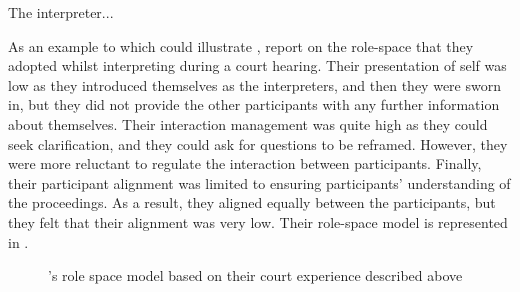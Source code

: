 \documentclass[output=paper]{langsci/langscibook}
\begin{document}
\begin{table}
The interpreter...
\caption{\label{tab:devaux:1}Sample list of role-space criteria}
\end{table}
As an example to which could illustrate , \citet[77--78]{Llewellyn-Jones2014} report on the role-space that they adopted whilst interpreting during a court hearing. Their presentation of self was low as they introduced themselves as the interpreters, and then they were sworn in, but they did not provide the other participants with any further information about themselves. Their interaction management was quite high as they could seek clarification, and they could ask for questions to be reframed. However, they were more reluctant to regulate the interaction between participants. Finally, their participant alignment was limited to ensuring participants’ understanding of the proceedings. As a result, they aligned equally between the participants, but they felt that their alignment was very low. Their role-space model is represented in . 

  
 

\begin{figure}
\caption{\citet{Llewellyn-Jones2014}’s role space model based on their court experience described above\label{fig:devaux:2}}
\end{figure}
\end{document}

